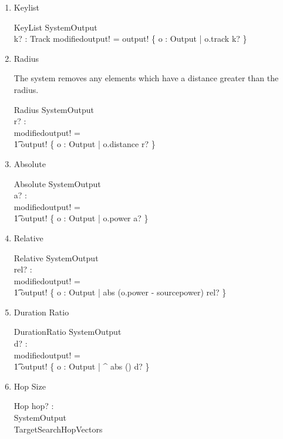 \documentclass[11pt]{article}
\begin{document}
\begin{enumerate}

\item Keylist

\begin{schema}{KeyList}
	SystemOutput \\
	k? : \power Track 
\where
	modifiedoutput! = output! \filter \{ o : Output |  o.track \in k? \} 
\end{schema}	

\item Radius
	
The system removes any elements which have a distance greater than the radius.

\begin{schema}{Radius}
	SystemOutput \\
	r? : \R \\
\where
	modifiedoutput! = \\ 
	\t1 output! \filter \{ o : Output | o.distance \leq r? \}
\end{schema}

\item Absolute

\begin{schema}{Absolute}
	SystemOutput \\
	a? : \R \\
\where
	modifiedoutput! = \\
	\t1 output! \filter \{ o : Output | o.power \geq  a? \} 
\end{schema}	
	
\item Relative



\begin{schema}{Relative}
	SystemOutput \\
	rel? : \R \\
\where
	modifiedoutput! = \\
	\t1 output! \filter \{ o : Output | abs (o.power  -  sourcepower) \leq rel?  \} 
\end{schema}	

\item Duration Ratio

\begin{schema}{DurationRatio}
	SystemOutput \\
	d? : \R \\
\where
	modifiedoutput! = \\
	\t1 output! \filter \{ o : Output | \exp ^ {abs \ln ()} \leq d?  \} 
\end{schema}	

\item Hop Size 

\begin{schema}{Hop}
	hop? : \nat \\
	SystemOutput \\
	TargetSearchHopVectors \\
\end{schema}

\end{enumerate}
\end{document}
